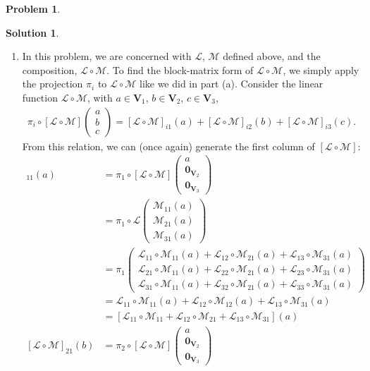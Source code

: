 \documentclass{article}
\theoremstyle{definition}
\newtheorem*{prob*}{Problem}
\newtheorem*{sln*}{Solution}
\newcommand{\V}{\mathbf{V}}
\newcommand{\lag}{\mathcal{L}}
\newcommand{\M}{\mathcal{M}}
\begin{document}
\begin{prob*}
\begin{sln*}
\begin{enumerate}
\begin{enumerate}
			\item In this problem, we are concerned with $\lag$, $\M$ defined above, and the composition, $\lag \circ \M$. To find the block-matrix form of $\lag\circ\M$, we simply apply the projection $\pi_i$ to $\lag\circ \M$ like we did in part (a). Consider the linear function $\lag \circ \M$, with $a\in \V_1$, $b\in \V_2$, $c\in \V_3$,
			\begin{align*}
			\pi_i \circ [\lag\circ \M]\begin{pmatrix}
			a\\b\\c
			\end{pmatrix}=
			[\lag\circ \M]_{i1}(a) + [\lag\circ \M]_{i2}(b) + [\lag\circ \M]_{i3}(c).
			\end{align*}
			From this relation, we can (once again) generate the first column of $[\lag\circ\M]$:
			\begin{align*}
			[\lag\circ\M]_{11}(a) &= \pi_1 \circ [\lag\circ \M]\begin{pmatrix}
			a\\ \mathbf{0}_{\V_2} \\ \mathbf{0}_{\V_3}
			\end{pmatrix}\\
			&= \pi_1 \circ \lag \begin{pmatrix}
			\M_{11}(a)\\
			\M_{21}(a)\\
			\M_{31}(a)
			\end{pmatrix}\\
			&= \pi_1\begin{pmatrix}
			\lag_{11}\circ\M_{11}(a) + \lag_{12}\circ\M_{21}(a) + \lag_{13}\circ\M_{31}(a) \\
			\lag_{21}\circ\M_{11}(a) + \lag_{22}\circ\M_{21}(a) + \lag_{23}\circ\M_{31}(a) \\
			\lag_{31}\circ\M_{11}(a) + \lag_{32}\circ\M_{21}(a) + \lag_{33}\circ\M_{31}(a)
			\end{pmatrix}\\
			&= \lag_{11}\circ\M_{11}(a) + \lag_{12}\circ\M_{12}(a) + \lag_{13}\circ\M_{31}(a)\\
			&= [\lag_{11}\circ \M_{11} + \lag_{12}\circ \M_{21} + \lag_{13}\circ \M_{31}](a)\\
			[\lag\circ\M]_{21}(b) &= \pi_2 \circ [\lag\circ \M]\begin{pmatrix}
			a\\ \mathbf{0}_{\V_2} \\ \mathbf{0}_{\V_3}
			\end{pmatrix}\\

\end{align*}
\end{enumerate}
\end{enumerate}
\end{sln*}
\end{prob*}
\end{document}
